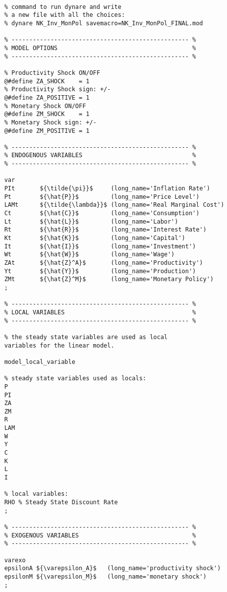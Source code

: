 \documentclass[
thesis.tex
]{subfiles}
\begin{document}
{\singlespacing

\begin{verbatim} 
	
	% command to run dynare and write
	% a new file with all the choices:
	% dynare NK_Inv_MonPol savemacro=NK_Inv_MonPol_FINAL.mod
	
	% -------------------------------------------------- %
	% MODEL OPTIONS                                      %
	% -------------------------------------------------- %
	
	% Productivity Shock ON/OFF
	@#define ZA_SHOCK    = 1
	% Productivity Shock sign: +/-
	@#define ZA_POSITIVE = 1
	% Monetary Shock ON/OFF
	@#define ZM_SHOCK    = 1
	% Monetary Shock sign: +/-
	@#define ZM_POSITIVE = 1
	
	% -------------------------------------------------- %
	% ENDOGENOUS VARIABLES                               %
	% -------------------------------------------------- %
	
	var
	PIt       ${\tilde{\pi}}$     (long_name='Inflation Rate')
	Pt        ${\hat{P}}$         (long_name='Price Level')
	LAMt      ${\tilde{\lambda}}$ (long_name='Real Marginal Cost')
	Ct        ${\hat{C}}$         (long_name='Consumption')
	Lt        ${\hat{L}}$         (long_name='Labor')
	Rt        ${\hat{R}}$         (long_name='Interest Rate')
	Kt        ${\hat{K}}$         (long_name='Capital')
	It        ${\hat{I}}$         (long_name='Investment')
	Wt        ${\hat{W}}$         (long_name='Wage')
	ZAt       ${\hat{Z}^A}$       (long_name='Productivity')
	Yt        ${\hat{Y}}$         (long_name='Production')
	ZMt       ${\hat{Z}^M}$       (long_name='Monetary Policy')
	;
	
	% -------------------------------------------------- %
	% LOCAL VARIABLES                                    %
	% -------------------------------------------------- %
	
	% the steady state variables are used as local 
	variables for the linear model.
	
	model_local_variable
	
	% steady state variables used as locals:
	P
	PI
	ZA
	ZM
	R
	LAM
	W
	Y
	C
	K
	L
	I
	
	% local variables:
	RHO % Steady State Discount Rate
	;
	
	% -------------------------------------------------- %
	% EXOGENOUS VARIABLES                                %
	% -------------------------------------------------- %
	
	varexo
	epsilonA ${\varepsilon_A}$   (long_name='productivity shock')
	epsilonM ${\varepsilon_M}$   (long_name='monetary shock')
	;
	

\end{verbatim}}
\end{document}
